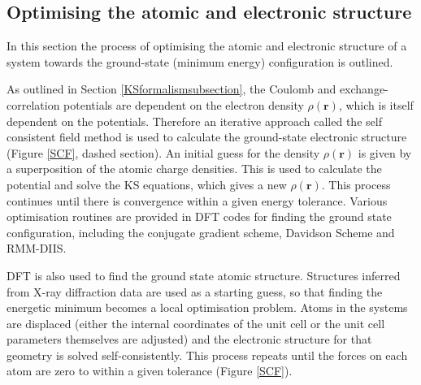 
\subsection{Optimising the atomic and electronic structure} \label{SCFsubsection}

In this section the process of optimising the atomic and electronic structure of a system towards the ground-state (minimum energy) configuration is outlined. 

As outlined in Section \ref{KSformalismsubsection}, the Coulomb and exchange-correlation potentials are dependent on the electron density $\rho(\mathbf{r})$, which is itself dependent on the potentials. Therefore an iterative approach called the self consistent field method is used to calculate the ground-state electronic structure (Figure \ref{SCF}, dashed section). An initial guess for the density $\rho(\textbf{r})$ is given by a superposition of the atomic charge densities. This is used to calculate the potential and solve the KS equations, which gives a new $\rho(\textbf{r})$. This process continues until there is convergence within a given energy tolerance. Various optimisation routines are provided in DFT codes for finding the ground state configuration, including the conjugate gradient scheme, Davidson Scheme and RMM-DIIS.

DFT is also used to find the ground state atomic structure. Structures inferred from X-ray diffraction data are used as a starting guess, so that finding the energetic minimum becomes a local optimisation problem. Atoms in the systems are displaced (either the internal coordinates of the unit cell or the unit cell parameters themselves are adjusted) and the electronic structure for that geometry is solved self-consistently. This process repeats until the forces on each atom are zero to within a given tolerance (Figure \ref{SCF}). 

